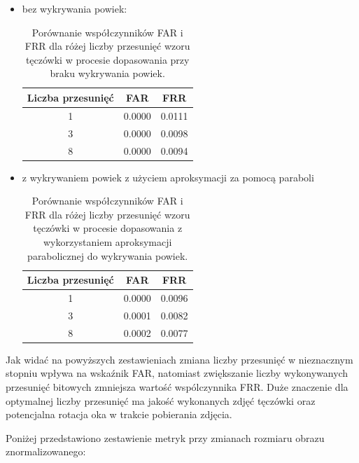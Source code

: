\begin{itemize}

  \item bez wykrywania powiek:

  \begin{table}[ht]
    \centering
    \begin{tabular}{c|c|c}
      \rowcolor{gray!20}
      Liczba przesunię\'c & FAR & FRR \\
      \hline\hline
      1 & 0.0000 & 0.0111 \\
      \hline
      3 & 0.0000 & 0.0098 \\
      \hline
      8 & 0.0000 & 0.0094 \\
    \end{tabular}
    \caption{Porównanie współczynników FAR i FRR dla różej liczby przesunię\'c wzoru tęczówki w procesie dopasowania
    przy braku wykrywania powiek.}
  \end{table}

  \item z wykrywaniem powiek z użyciem aproksymacji za pomocą paraboli

  \begin{table}[ht]
    \centering
    \begin{tabular}{c|c|c}
      \rowcolor{gray!20}
      Liczba przesunię\'c & FAR & FRR \\
      \hline\hline
      1 & 0.0000 & 0.0096 \\
      \hline
      3 & 0.0001 & 0.0082 \\
      \hline
      8 & 0.0002 & 0.0077 \\
    \end{tabular}
    \caption{Porównanie współczynników FAR i FRR dla różej liczby przesunię\'c wzoru tęczówki w procesie dopasowania
    z wykorzystaniem aproksymacji parabolicznej do wykrywania powiek.}
  \end{table}
\end{itemize}

Jak wida\'c na powyższych zestawieniach zmiana liczby przesunię\'c w nieznacznym stopniu wpływa
na wska\'znik FAR, natomiast zwiększanie liczby wykonywanych przesunię\'c bitowych zmniejsza wartoś\'c
wspólczynnika FRR. Duże znaczenie dla optymalnej liczby przesunię\'c ma jakoś\'c wykonanych zdję\'c tęczówki
oraz potencjalna rotacja oka w trakcie pobierania zdjęcia.

\noindent
Poniżej przedstawiono zestawienie metryk przy zmianach rozmiaru obrazu znormalizowanego:

